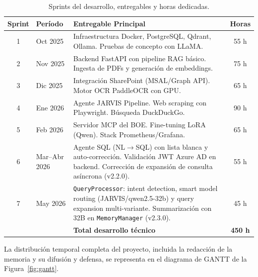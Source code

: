 \begin{table}[H]
\centering
\caption{Sprints del desarrollo, entregables y horas dedicadas.}
\label{tab:iteraciones}
\begin{tabular}{clp{6cm}c}
\toprule
\textbf{Sprint} & \textbf{Período} & \textbf{Entregable Principal} & \textbf{Horas} \\
\midrule
1 & Oct 2025 & Infraestructura Docker, PostgreSQL, Qdrant, Ollama. Pruebas de concepto con LLaMA. & 55 h \\
2 & Nov 2025 & Backend FastAPI con pipeline RAG básico. Ingesta de PDFs y generación de embeddings. & 75 h \\
3 & Dic 2025 & Integración SharePoint (MSAL/Graph API). Motor OCR PaddleOCR con GPU. & 65 h \\
4 & Ene 2026 & Agente JARVIS Pipeline. Web scraping con Playwright. Búsqueda DuckDuckGo. & 90 h \\
5 & Feb 2026 & Servidor MCP del BOE. Fine-tuning LoRA (Qwen). Stack Prometheus/Grafana. & 65 h \\
6 & Mar--Abr 2026 & Agente SQL (NL$\rightarrow$SQL) con lista blanca y auto-corrección. Validación JWT Azure AD en backend. Corrección de expansión de consulta asíncrona (v2.2.0). & 55 h \\
7 & May 2026 & \texttt{QueryProcessor}: intent detection, smart model routing (JARVIS/qwen2.5-32b) y query expansion multi-variante. Summarización con 32B en \texttt{MemoryManager} (v2.3.0). & 45 h \\
\midrule
 & & \textbf{Total desarrollo técnico} & \textbf{450 h} \\
\bottomrule
\end{tabular}
\end{table}

La distribución temporal completa del proyecto, incluida la redacción de la memoria y su difusión y defensa, se representa en el diagrama de GANTT de la Figura~\ref{fig:gantt}.

